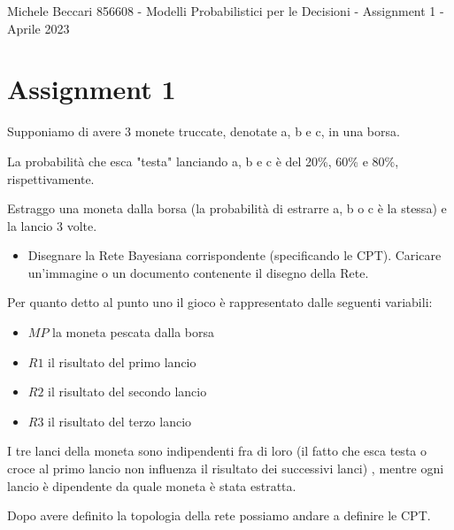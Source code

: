 \documentclass{article}
\begin{document}
	{Michele Beccari 856608 - Modelli Probabilistici per le Decisioni -  Assignment 1 - Aprile 2023} 
	\section{Assignment 1}
Supponiamo di avere 3 monete truccate, denotate  a, b e c, in una borsa.
	
La probabilità che esca "testa" lanciando a, b e c è del 20\%, 60\% e 80\%, rispettivamente.
	
Estraggo una moneta dalla borsa (la probabilità di estrarre a, b o c è la stessa) e la lancio 3 volte.

\begin{itemize}
	\item Disegnare la Rete Bayesiana corrispondente (specificando le CPT). Caricare un'immagine o un documento contenente il disegno della Rete.
\end{itemize}

Per quanto detto al punto uno il gioco è rappresentato dalle seguenti variabili:

\begin{itemize}
	\item \(MP\) la moneta pescata dalla borsa
	\item \(R1\) il risultato del primo lancio
	\item \(R2\) il risultato del secondo lancio
	\item \(R3\) il risultato del terzo lancio
\end{itemize}

I tre lanci della moneta sono indipendenti fra di loro (il fatto che esca testa o croce al primo lancio non influenza il risultato dei successivi lanci) , mentre ogni lancio è dipendente da quale moneta è stata estratta.

 \begin{center}
\end{center}
	
Dopo avere definito la topologia della rete possiamo andare a definire le CPT. \\
\end{document}
